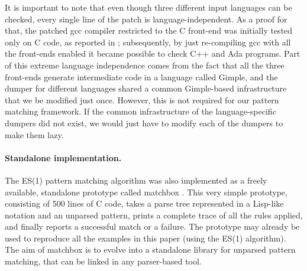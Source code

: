 \documentclass{sigplanconf}
\begin{document}
It is important to note that even though three different input
languages can be checked, every single line of the patch is
language-independent. As a proof for that, the patched gcc compiler
restricted to the C front-end was initially tested only on C code, as
reported in \cite{ppdp}; subsequently, by just re-compiling gcc with
all the front-ends enabled it became possible to check C++ and Ada
programs. Part of this extreme language independence comes from the
fact that all the three front-ends generate intermediate code in a
language called Gimple, and the dumper for different languages shared
a common Gimple-based infrastructure that we be modified just
once. However, this is not required for our pattern matching
framework.
If the common infrastructure of the language-specific dumpers did not
exist, we would just have to modify each of the dumpers to make them
lazy.

\paragraph{Standalone implementation.}
The ES(1) pattern matching algorithm was also implemented as a freely
available, standalone prototype called matchbox \cite{matchbox}. This
very simple prototype, consisting of 500 lines of C code, takes a
parse tree represented in a Lisp-like notation and an unparsed
pattern, prints a complete trace of all the rules applied, and
finally reports a successful match or a failure. The prototype may
already be used to reproduce all the examples in this paper (using the
ES(1) algorithm). The aim of matchbox is to evolve into a standalone
library for unparsed pattern matching, that can be linked in any
parser-based tool.
\end{document}
